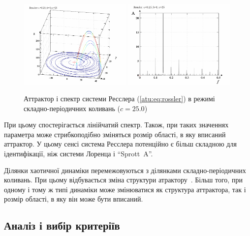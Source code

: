 \begin{figure}[ht!]
\begin{center}
  \includegraphics[width=0.49\textwidth]{p/cha/ross/ross0-p_xyz_c=25x00.png}
  \hfill
  \includegraphics[width=0.49\textwidth]{p/cha/ross/ross_f-p_f_c=25x00.png}
\end{center}
\caption{Аттрактор і спектр системи Ресслера (\ref{atu:eq:rossler}) в режимі складно-періодичних коливань ($ c = 25.0 $)}
\label{atu:f:ross_attractor_2500}
\end{figure}

При цьому спостерігається лінійчатий спектр. Також, при таких
значеннях параметра може стрибкоподібно зміняться розмір області, в яку
вписаний аттрактор. У цьому сенсі система Ресслера потенційно є
більш складною для ідентифікації, ніж системи Лоренца і ``Sprott~A''.

Ділянки хаотичної динаміки перемежовуються з ділянками
складно-періодичних коливань. При цьому відбувається зміна
структури атрактору~\cite{buscarino_sync_rossler, rosalie_rossler_template}. Більш того,
при одному і тому ж типі динаміки може змінюватися як структура
аттрактора, так і розмір області, в яку він може бути вписаний.


\subsection{Аналіз і вибір критеріїв} %


